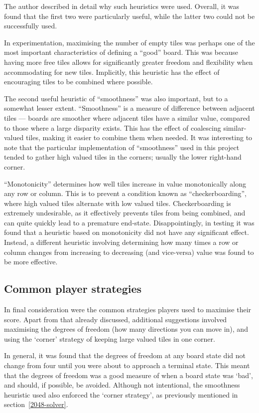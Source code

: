 \documentclass[a4paper, 11pt, titlepage]{report}
\begin{document}
The author described in detail why such heuristics were used\cite{2048explanation}. Overall, it was found that the first two were particularly useful, while the latter two could not be successfully used. 

In experimentation, maximising the number of empty tiles was perhaps one of the most important characteristics of defining a ``good'' board. This was because having more free tiles allows for significantly greater freedom and flexibility when accommodating for new tiles. Implicitly, this heuristic has the effect of encouraging tiles to be combined where possible.

The second useful heuristic of ``smoothness'' was also important, but to a somewhat lesser extent. ``Smoothness'' is a measure of difference between adjacent tiles ---  boards are smoother where adjacent tiles have a similar value, compared to those where a large disparity exists. This has the effect of coalescing similar-valued tiles, making it easier to combine them when needed. It was interesting to note that the particular implementation of ``smoothness'' used in this project tended to gather high valued tiles in the corners; usually the lower right-hand corner.

``Monotonicity'' determines how well tiles increase in value monotonically along any row or column. This is to prevent a condition known as ``checkerboarding'', where high valued tiles alternate with low valued tiles. Checkerboarding is extremely undesirable, as it effectively prevents tiles from being combined, and can quite quickly lead to a premature end-state. Disappointingly, in testing it was found that a heuristic based on monotonicity did not have any significant effect. Instead, a different heuristic involving determining how many times a row or column changes from increasing to decreasing (and vice-versa) value was found to be more effective.

\subsection{Common player strategies}
In final consideration were the common strategies\cite{threes-strategies} players used to maximise their score. Apart from that already discussed, additional suggestions involved maximising the degrees of freedom (how many directions you can move in), and using the `corner' strategy of keeping large valued tiles in one corner. 

In general, it was found that the degrees of freedom at any board state did not change from four until you were about to approach a terminal state. This meant that the degrees of freedom was a good measure of when a board state was `bad', and should, if possible, be avoided. Although not intentional, the smoothness heuristic used also enforced the `corner strategy', as previously mentioned in section~\ref{2048-solver}.
\end{document}
